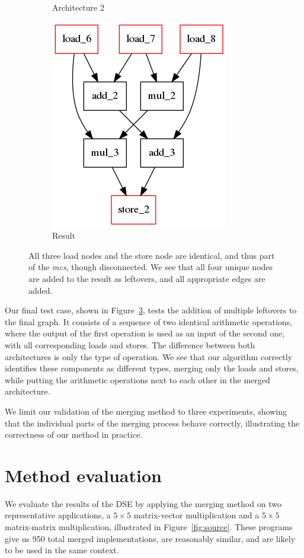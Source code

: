 \begin{figure}[!htb]
\begin{subfigure}[t]{0.33\textwidth}
    \caption{Architecture 2}
    \label{fig:multiple:b}
  \end{subfigure}
  \begin{subfigure}[t]{0.33\textwidth}
    \centering
    \includegraphics[scale=0.5]{graphs/test_multiple.png}
    \caption{Result}
    \label{fig:multiple:c}
  \end{subfigure}
\caption{All three load nodes and the store node are identical, and thus part of the \textit{mcs}, though disconnected. We see that all four unique nodes are added to the result as leftovers, and all appropriate edges are added.}
\label{fig:multiple}
\end{figure}

Our final test case, shown in Figure~\ref{fig:multiple}, tests the addition of multiple leftovers to the final graph. It consists of a sequence of two identical arithmetic operations, where the output of the first operation is used as an input of the second one, with all corresponding loads and stores. The difference between both architectures is only the type of operation. We see that our algorithm correctly identifies these components as different types, merging only the loads and stores, while putting the arithmetic operations next to each other in the merged architecture.

We limit our validation of the merging method to three experiments, showing that the individual parts of the merging process behave correctly, illustrating the correctness of our method in practice.

\section{Method evaluation}
We evaluate the results of the DSE by applying the merging method on two representative applications, a $5 \times 5$ matrix-vector multiplication and a $5 \times 5$ matrix-matrix multiplication, illustrated in Figure~\ref{fig:source}. These programs give us 950 total merged implementations, are reasonably similar, and are likely to be used in the same context.

